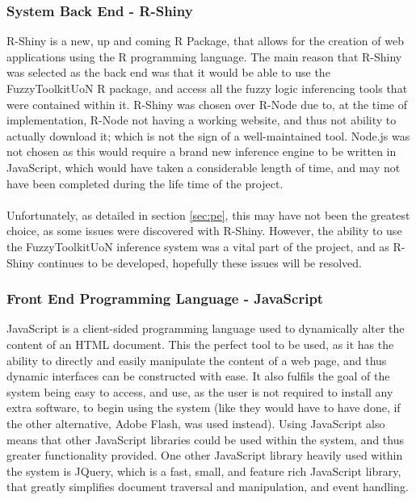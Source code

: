 \tocless\subsubsection{System Back End - R-Shiny}
R-Shiny is a new, up and coming R Package, that allows for the creation of web applications using the R programming language. The main reason that R-Shiny was selected as the back end was that it would be able to use the FuzzyToolkitUoN R package, and access all the fuzzy logic inferencing tools that were contained within it. R-Shiny was chosen over R-Node due to, at the time of implementation, R-Node not having a working website, and thus not ability to actually download it; which is not the sign of a well-maintained tool. Node.js was not chosen as this would require a brand new inference engine to be written in JavaScript, which would have taken a considerable length of time, and may not have been completed during the life time of the project.\ \\
\ \\
Unfortunately, as detailed in section \ref{sec:pe}, this may have not been the greatest choice, as some issues were discovered with R-Shiny. However, the ability to use the FuzzyToolkitUoN inference system was a vital part of the project, and as R-Shiny continues to be developed, hopefully these issues will be resolved.

\tocless\subsubsection{Front End Programming Language - JavaScript}
JavaScript is a client-sided programming language used to dynamically alter the content of an HTML document. This the perfect tool to be used, as it has the ability to directly and easily manipulate the content of a web page, and thus dynamic interfaces can be constructed with ease. It also fulfils the goal of the system being easy to access, and use, as the user is not required to install any extra software, to begin using the system (like they would have to have done, if the other alternative, Adobe Flash, was used instead). Using JavaScript also means that other JavaScript libraries could be used within the system, and thus greater functionality provided. One other JavaScript library heavily used within the system is JQuery, which is a fast, small, and feature rich JavaScript library, that greatly simplifies document traversal and manipulation, and event handling.

